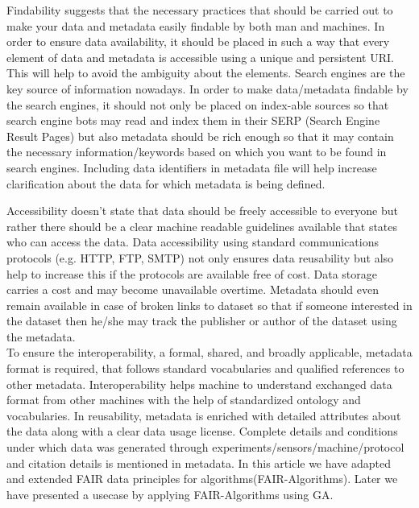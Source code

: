 \documentclass[preprint,12pt]{elsarticle}
\begin{document}
Findability suggests that the necessary practices that should be carried out to make your data and metadata easily findable by both man and machines. In order to ensure data availability, it should be placed in such a way that every element of data and metadata is accessible using a unique and persistent URI. This will help to avoid the ambiguity about the elements. Search engines are the key source of information nowadays. In order to make data/metadata findable by the search engines, it should not only be placed on index-able sources so that search engine bots may read and index them in their SERP (Search Engine Result Pages) but also metadata should be rich enough so that it may contain the necessary information/keywords based on which you want to be found in search engines. Including data identifiers in metadata file will help increase clarification about the data for which metadata is being defined.

Accessibility doesn't state that data should be freely accessible to everyone but rather there should be a clear machine readable guidelines available that states who can access the data. Data accessibility using standard communications protocols (e.g. HTTP, FTP, SMTP) not only ensures data reusability but also help to increase this if the protocols are available free of cost. Data storage carries a cost and may become unavailable overtime. Metadata should even remain available in case of broken links to dataset so that if someone interested in the dataset then he/she may track the publisher or author of the dataset using the metadata.\\
To ensure the interoperability, a formal, shared, and broadly applicable, metadata format is required, that follows standard vocabularies and qualified references to other metadata. Interoperability helps machine to understand exchanged data format from other machines with the help of standardized ontology and vocabularies. 
In reusability, metadata is enriched with detailed attributes about the data along with a clear data usage license. Complete details and conditions under which data was generated through experiments/sensors/machine/protocol and citation details is mentioned in metadata. In this article we have adapted and extended FAIR data principles for algorithms(FAIR-Algorithms). Later we have presented a usecase by applying FAIR-Algorithms using GA.
\end{document}
